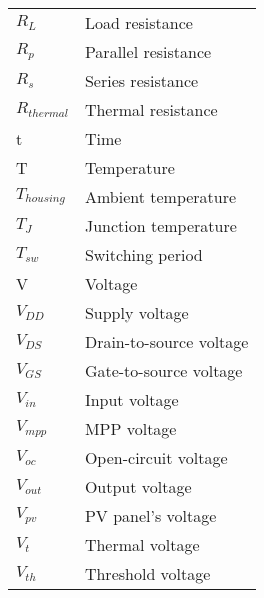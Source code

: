 \begin{tabular}{ll}
$R_{L}$ & Load resistance\\
$R_{p}$ & Parallel resistance \\
$R_{s}$ & Series resistance \\
$R_{thermal}$ & Thermal resistance\\
t & Time\\
T & Temperature \\
$T_{housing}$ & Ambient temperature \\
$T_{J}$ & Junction temperature \\
$T_{sw}$ & Switching period \\
V & Voltage\\
$V_{DD}$ & Supply voltage\\
$V_{DS}$ & Drain-to-source voltage\\
$V_{GS}$ & Gate-to-source voltage\\
$V_{in}$ & Input voltage \\
$V_{mpp}$ & MPP voltage\\
$V_{oc}$ & Open-circuit voltage\\
$V_{out}$ & Output voltage \\
$V_{pv}$ & PV panel's voltage \\
$V_{t}$ & Thermal voltage \\
$V_{th}$ & Threshold voltage \\

\end{tabular}